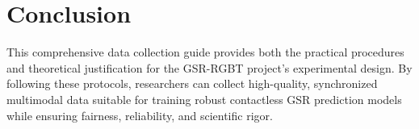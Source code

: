 \documentclass{article}
\begin{document}
\section{Conclusion}

This comprehensive data collection guide provides both the practical procedures and theoretical justification for the GSR-RGBT project's experimental design. By following these protocols, researchers can collect high-quality, synchronized multimodal data suitable for training robust contactless GSR prediction models while ensuring fairness, reliability, and scientific rigor.
\end{document}

